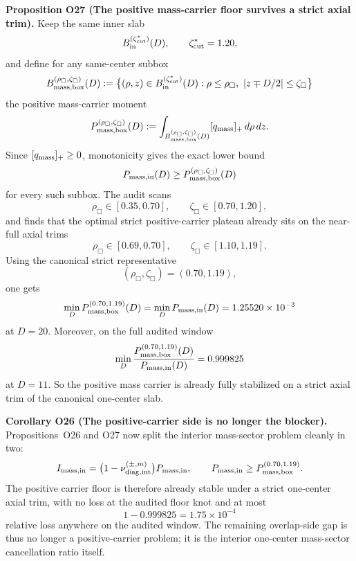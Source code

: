 \documentclass[aps,prd,onecolumn,notitlepage,nofootinbib,superscriptaddress,11pt,floatfix]{revtex4-2}
\begin{document}
\medskip\noindent\textbf{Proposition O27 (The positive mass-carrier floor survives a strict axial trim).}
Keep the same inner slab
\[
B_{\rm in}^{(\zeta_{\rm cut}^{\ast})}(D),
\qquad
\zeta_{\rm cut}^{\ast}=1.20,
\]
and define for any same-center subbox
\[
B_{\rm mass,box}^{(\rho_\Box,\zeta_\Box)}(D)
:=
\bigl\{(\rho,z)\in B_{\rm in}^{(\zeta_{\rm cut}^{\ast})}(D): \rho\le \rho_\Box,\ |z\mp D/2|\le \zeta_\Box\bigr\}
\]
the positive mass-carrier moment
\[
P_{\rm mass,box}^{(\rho_\Box,\zeta_\Box)}(D)
:=
\int_{B_{\rm mass,box}^{(\rho_\Box,\zeta_\Box)}(D)} [q_{\rm mass}]_+\,d\rho\,dz.
\]
Since \([q_{\rm mass}]_+\ge 0\), monotonicity gives the exact lower bound
\[
P_{\rm mass,in}(D)\ge P_{\rm mass,box}^{(\rho_\Box,\zeta_\Box)}(D)
\]
for every such subbox.
The audit
scans
\[
\rho_\Box\in[0.35,0.70],
\qquad
\zeta_\Box\in[0.70,1.20],
\]
and finds that the optimal strict positive-carrier plateau already sits on the near-full axial trims
\[
\rho_\Box\in[0.69,0.70],
\qquad
\zeta_\Box\in[1.10,1.19].
\]
Using the canonical strict representative
\[
(\rho_\Box,\zeta_\Box)=(0.70,1.19),
\]
one gets
\[
\min_D P_{\rm mass,box}^{(0.70,1.19)}(D)
=
\min_D P_{\rm mass,in}(D)
=
1.25520\times10^{-3}
\]
at \(D=20\). Moreover, on the full audited window
\[
\min_D
\frac{P_{\rm mass,box}^{(0.70,1.19)}(D)}{P_{\rm mass,in}(D)}
=
0.999825
\]
at \(D=11\). So the positive mass carrier is already fully stabilized on a strict axial trim of the canonical one-center slab.

\medskip\noindent\textbf{Corollary O26 (The positive-carrier side is no longer the blocker).}
Propositions~O26 and O27 now split the interior mass-sector problem cleanly in two:
\[
I_{\rm mass,in}
=
\bigl(1-\nu_{\rm diag,int}^{(\pm,m)}\bigr)P_{\rm mass,in},
\qquad
P_{\rm mass,in}\ge P_{\rm mass,box}^{(0.70,1.19)}.
\]
The positive carrier floor is therefore already stable under a strict one-center axial trim, with no loss at the audited floor knot and at most
\[
1-0.999825=1.75\times10^{-4}
\]
relative loss anywhere on the audited window. The remaining overlap-side gap is thus no longer a positive-carrier problem; it is the interior one-center mass-sector cancellation ratio itself.
\end{document}
